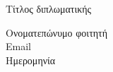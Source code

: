 \clearpage
\thispagestyle{empty}

\vspace*{\fill}
\begin{center}
    \Huge Τίτλος διπλωματικής \\
    \vspace{2cm}

    \normalsize Ονοματεπώνυμο φοιτητή \\
    \normalsize Email \\

    \vspace{1cm}
    \normalsize Ημερομηνία\\
\end{center}

\vspace*{\fill}


